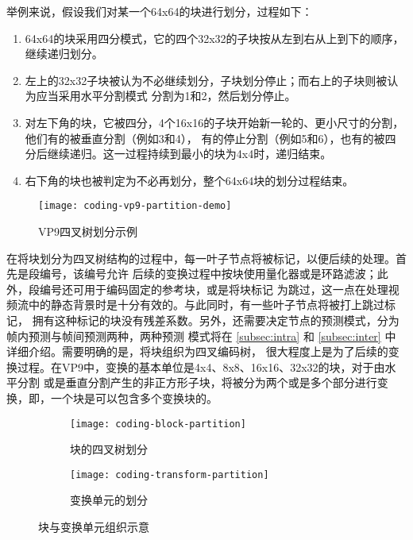 举例来说，假设我们对某一个64x64的块进行划分，过程如下：
\begin{enumerate}
  \item 64x64的块采用四分模式，它的四个32x32的子块按从左到右从上到下的顺序，继续递归划分。
  \item 左上的32x32子块被认为不必继续划分，子块划分停止；而右上的子块则被认为应当采用水平分割模式
  分割为1和2，然后划分停止。
  \item 对左下角的块，它被四分，4个16x16的子块开始新一轮的、更小尺寸的分割，他们有的被垂直分割（例如3和4），
  有的停止分割（例如5和6），也有的被四分后继续递归。这一过程持续到最小的块为4x4时，递归结束。
  \item 右下角的块也被判定为不必再划分，整个64x64块的划分过程结束。
\end{enumerate}

\begin{figure}[H] %
  \centering
  \texttt{[image: coding-vp9-partition-demo]}
  \caption{VP9四叉树划分示例}
  \label{fig:coding-vp9-partition-demo}
\end{figure}

在将块划分为四叉树结构的过程中，每一叶子节点将被标记，以便后续的处理。首先是段编号，该编号允许
后续的变换过程中按块使用量化器或是环路滤波；此外，段编号还可用于编码固定的参考块，或是将块标记
为跳过，这一点在处理视频流中的静态背景时是十分有效的。与此同时，有一些叶子节点将被打上跳过标记，
拥有这种标记的块没有残差系数。另外，还需要决定节点的预测模式，分为帧内预测与帧间预测两种，两种预测
模式将在 \ref{subsec:intra} 和 \ref{subsec:inter} 中详细介绍。需要明确的是，将块组织为四叉编码树，
很大程度上是为了后续的变换过程。在VP9中，变换的基本单位是4x4、8x8、16x16、32x32的块，对于由水平分割
或是垂直分割产生的非正方形子块，将被分为两个或是多个部分进行变换，即，一个块是可以包含多个变换块的。

\begin{figure}[H]
  \centering%
  \begin{subfigure}{0.43\textwidth}
    \centering
    \texttt{[image: coding-block-partition]}
    \caption{块的四叉树划分}
  \end{subfigure}%
  \hspace{2em}%
  \begin{subfigure}{0.43\textwidth}
    \centering
    \texttt{[image: coding-transform-partition]}
    \caption{变换单元的划分}
  \end{subfigure}
  \caption{块与变换单元组织示意}
\end{figure}

